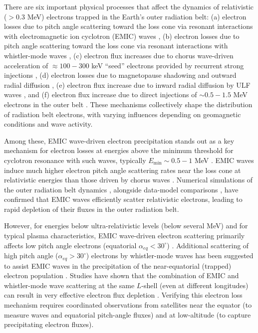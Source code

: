 \documentclass[
  letterpaper,
  DIV=11,
  numbers=noendperiod]{scrartcl}
\begin{document}
There are six important physical processes that affect the dynamics of relativistic (\(>0.3\) MeV) electrons trapped in the Earth's outer radiation belt: (a) electron losses due to pitch angle scattering toward the loss cone via resonant interactions with electromagnetic ion cyclotron (EMIC) waves \cite{Thorne&Kennel71, Miyoshi08, Ross21, Summers&Thorne03, Millan&Thorne07, Miyoshi08,Shprits08:JASTP_local, Angelopoulos23:ssr}, (b) electron losses due to pitch angle scattering toward the loss cone via resonant interactions with whistler-mode waves \cite{Horne05JGR, Mourenas14}, (c) electron flux increases due to chorus wave-driven acceleration of \(\approx100-300\) keV ``seed'' electrons \cite{Miyoshi03, Thorne13:nature, Li14:storm, Mourenas14:fluxes,Allison&Shprits20, Jaynes15:seedelectrons} provided by recurrent strong injections \cite{Hua2022, Mourenas23:jgr:upper_limit}, (d) electron losses due to magnetopause shadowing and outward radial diffusion \cite{Shprits06:magnetopause, Boynton16, Boynton17, Olifer18}, (e) electron flux increase due to inward radial diffusion by ULF waves \cite{Ozeke14, Ozeke2020}, and (f) electron flux increase due to direct injections of \(\sim0.5-1.5\) MeV electrons in the outer belt \cite{Kim21, Tang22}. These mechanisms collectively shape the distribution of radiation belt electrons, with varying influences depending on geomagnetic conditions and wave activity.

Among these, EMIC wave-driven electron precipitation stands out as a key mechanism for electron losses at energies above the minimum threshold for cyclotron resonance with such waves, typically \(E_{\min}\sim 0.5-1\) MeV \cite{Summers&Thorne03, Summers07:theory, Usanova14, Kurita18:emic, Nakamura22:emic}. EMIC waves induce much higher electron pitch angle scattering rates near the loss cone at relativistic energies than those driven by chorus waves \cite{Glauert&Horne05, Summers07:rates, Ni15}. Numerical simulations of the outer radiation belt dynamics \cite{Ma15, Shprits16, Drozdov17}, alongside data-model comparisons \cite{Shprits17, Kim21:emic, Drozdov22:dropout, Adair22, Angelopoulos23:ssr}, have confirmed that EMIC waves efficiently scatter relativistic electrons, leading to rapid depletion of their fluxes in the outer radiation belt.

However, for energies below ultra-relativistic levels (below several MeV) and for typical plasma characteristics, EMIC wave-driven electron scattering primarily affects low pitch angle electrons (equatorial \(\alpha_{eq}<30^\circ\)) \cite{Ni15, Kersten14}. Additional scattering of high pitch angle (\(\alpha_{eq}>30^\circ\)) electrons by whistler-mode waves has been suggested to assist EMIC waves in the precipitation of the near-equatorial (trapped) electron population \cite{Mourenas16:grl, Zhang17, Drozdov20}. Studies have shown that the combination of EMIC and whistler-mode wave scattering at the same \(L\)-shell (even at different longitudes) can result in very effective electron flux depletion \cite{Mourenas16:grl, Kim21:emic, Drozdov22:dropout}. Verifying this electron loss mechanism requires coordinated observations from satellites near the equator (to measure waves and equatorial pitch-angle fluxes) and at low-altitude (to capture precipitating electron fluxes).
\end{document}
